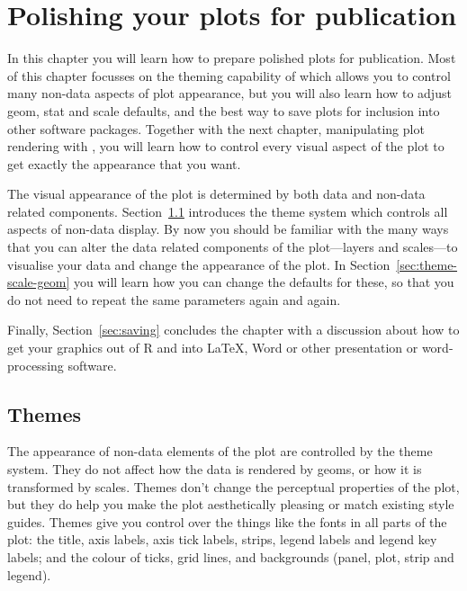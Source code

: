 

% 


\chapter{Polishing your plots for publication}
\label{cha:polishing}

In this chapter you will learn how to prepare polished plots for publication.  Most of this chapter focusses on the theming capability of \ggplot which allows you to control many non-data aspects of plot appearance, but you will also learn how to adjust geom, stat and scale defaults, and the best way to save plots for inclusion into other software packages.  Together with the next chapter, manipulating plot rendering with , you will learn how to control every visual aspect of the plot to get exactly the appearance that you want.

The visual appearance of the plot is determined by both data and non-data related components.  Section~\ref{sec:themes} introduces the theme system which controls all aspects of non-data display.  By now you should be familiar with the many ways that you can alter the data related components of the plot---layers and scales---to visualise your data and change the appearance of the plot.  In Section~\ref{sec:theme-scale-geom} you will learn how you can change the defaults for these, so that you do not need to repeat the same parameters again and again.

Finally, Section~\ref{sec:saving} concludes the chapter with a discussion about how to get your graphics out of R and into \LaTeX, Word or other presentation or word-processing software.


\section{Themes} 
\label{sec:themes}

The appearance of non-data elements of the plot are controlled by the theme system.  They do not affect how the data is rendered by geoms, or how it is transformed by scales.  Themes don't change the perceptual properties of the plot, but they do help you make the plot aesthetically pleasing or match existing style guides.  Themes give you control over the things like the  fonts in all parts of the plot: the title, axis labels, axis tick labels, strips, legend labels and legend key labels; and the colour of ticks, grid lines, and backgrounds (panel, plot, strip and legend).

